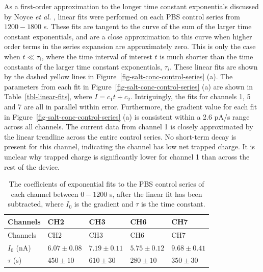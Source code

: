 \documentclass[
  a4paper,
]{scrbook}
\begin{document}
As a first-order approximation to the longer time constant exponentials
discussed by Noyce \emph{et al.} \autocite{Noyce2019}, linear fits were
performed on each PBS control series from \(1200-1800\) s. These fits
are tangent to the curve of the sum of the larger time constant
exponentials, and are a close approximation to this curve when higher
order terms in the series expansion are approximately zero. This is only
the case when \(t\ll\tau_i\), where the time interval of interest \(t\)
is much shorter than the time constants of the larger time constant
exponentials, \(\tau_i\). These linear fits are shown by the dashed
yellow lines in Figure~\ref{fig-salt-conc-control-series} (a). The
parameters from each fit in Figure~\ref{fig-salt-conc-control-series}
(a) are shown in Table~\ref{tbl-linear-fits}, where \(I = c_1t + c_2\).
Intriguingly, the fits for channels 1, 5 and 7 are all in parallel
within error. Furthermore, the gradient value for each fit in
Figure~\ref{fig-salt-conc-control-series} (a) is consistent within a 2.6
pA/s range across all channels. The current data from channel 1 is
closely approximated by the linear trendline across the entire control
series. No short-term decay is present for this channel, indicating the
channel has low net trapped charge. It is unclear why trapped charge is
significantly lower for channel 1 than across the rest of the device.

\hypertarget{tbl-exp-fits}{}
\begin{longtable}[]{@{}lllll@{}}
\caption{\label{tbl-exp-fits}The coefficients of exponential fits to the
PBS control series of each channel between \(0-1200\) s, after the
linear fit has been subtracted, where \(I_0\) is the gradient and
\(\tau\) is the time constant.\\
}\tabularnewline
\toprule\noalign{}
Channels & CH2 & CH3 & CH6 & CH7 \\
\midrule\noalign{}
\endfirsthead
\toprule\noalign{}
Channels & CH2 & CH3 & CH6 & CH7 \\
\midrule\noalign{}
\endhead
\bottomrule\noalign{}
\endlastfoot
\(I_0\) (nA) & \(6.07\pm0.08\) & \(7.19\pm0.11\) & \(5.75\pm0.12\) &
\(9.68\pm0.41\) \\
\(\tau\) (s) & \(450\pm10\) & \(610\pm30\) & \(280\pm10\) &
\(350\pm30\) \\
\end{longtable}
\end{document}
